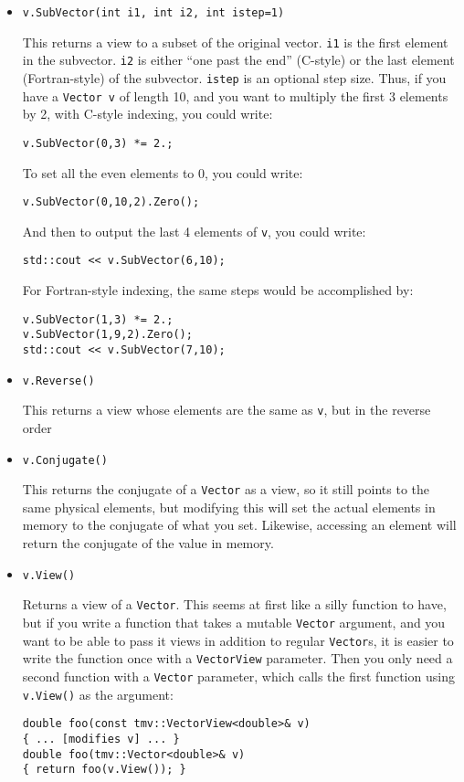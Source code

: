 \documentclass[twoside,letterpaper,11pt]{article}
\renewcommand{\tt}[1]{{\texttt {#1}}}
\begin{document}
\begin{itemize}
\item
\begin{verbatim}
v.SubVector(int i1, int i2, int istep=1)
\end{verbatim}
This returns a view to a subset of the original vector.
\tt{i1} is the first element in the subvector.
\tt{i2} is either ``one past the end'' (C-style) or the last element
(Fortran-style) of the subvector.
\tt{istep} is an optional step size.
Thus, if you have a \tt{Vector~v} of length 10, and you want to
multiply the first 3 elements by 2, with C-style indexing, you could write:
\begin{verbatim}
v.SubVector(0,3) *= 2.;
\end{verbatim}
To set all the even elements to 0, you could write:
\begin{verbatim}
v.SubVector(0,10,2).Zero();
\end{verbatim}
And then to output the last 4 elements of \tt{v}, you could write:
\begin{verbatim}
std::cout << v.SubVector(6,10);
\end{verbatim}

For Fortran-style indexing, the same steps would be accomplished by:
\begin{verbatim}
v.SubVector(1,3) *= 2.;
v.SubVector(1,9,2).Zero();
std::cout << v.SubVector(7,10);
\end{verbatim}

\item
\begin{verbatim}
v.Reverse()
\end{verbatim}
This returns a view whose elements are the same as \tt{v},
but in the reverse order

\item
\begin{verbatim}
v.Conjugate()
\end{verbatim}
This returns the conjugate of a \tt{Vector} as a view, so it still points
to the same physical elements, but modifying this will set the 
actual elements in memory to the conjugate of what you set.  Likewise,
accessing an element will return the conjugate of the value in memory.

\item
\begin{verbatim}
v.View()
\end{verbatim}
Returns a view of a \tt{Vector}.  This seems at first like a silly function to have, but
if you write a function that takes a mutable \tt{Vector} argument, and you want to
be able to pass it views in addition to regular \tt{Vector}s, it is easier to write the 
function once with a \tt{VectorView} parameter.  Then you only need a second 
function with a \tt{Vector} parameter, which calls the first function
using \tt{v.View()} as the argument:
\begin{verbatim}
double foo(const tmv::VectorView<double>& v)
{ ... [modifies v] ... }
double foo(tmv::Vector<double>& v)
{ return foo(v.View()); }
\end{verbatim}


\end{itemize}
\end{document}
